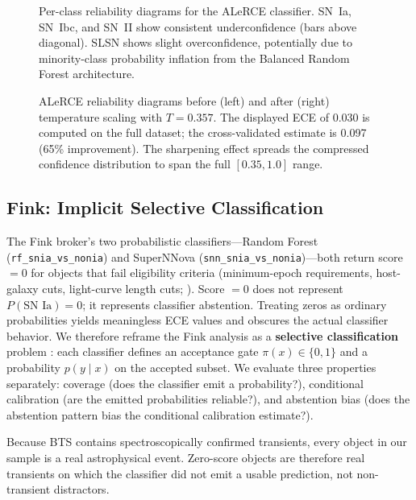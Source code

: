 \documentclass[twocolumn]{aastex631}
\begin{document}
\begin{figure}
\caption{Per-class reliability diagrams for the ALeRCE classifier. SN~Ia, SN~Ibc, and SN~II show consistent underconfidence (bars above diagonal). SLSN shows slight overconfidence, potentially due to minority-class probability inflation from the Balanced Random Forest architecture. \label{fig:alerce_perclass}}
\end{figure}

\begin{figure}
\caption{ALeRCE reliability diagrams before (left) and after (right) temperature scaling with $T = 0.357$. The displayed ECE of 0.030 is computed on the full dataset; the cross-validated estimate is 0.097 (65\% improvement). The sharpening effect spreads the compressed confidence distribution to span the full $[0.35, 1.0]$ range. \label{fig:alerce_tempscaling}}
\end{figure}


\subsection{Fink: Implicit Selective Classification} \label{sec:fink}

The Fink broker's two probabilistic classifiers---Random Forest (\texttt{rf\_snia\_vs\_nonia}) and SuperNNova (\texttt{snn\_snia\_vs\_nonia})---both return score $= 0$ for objects that fail eligibility criteria (minimum-epoch requirements, host-galaxy cuts, light-curve length cuts; \citealt{leoni2022, moller2020}). Score $= 0$ does not represent $P(\text{SN~Ia}) = 0$; it represents classifier abstention. Treating zeros as ordinary probabilities yields meaningless ECE values and obscures the actual classifier behavior. We therefore reframe the Fink analysis as a \textbf{selective classification} problem \citep{geifman2017}: each classifier defines an acceptance gate $\pi(x) \in \{0, 1\}$ and a probability $p(y \mid x)$ on the accepted subset. We evaluate three properties separately: coverage (does the classifier emit a probability?), conditional calibration (are the emitted probabilities reliable?), and abstention bias (does the abstention pattern bias the conditional calibration estimate?).

Because BTS contains spectroscopically confirmed transients, every object in our sample is a real astrophysical event. Zero-score objects are therefore real transients on which the classifier did not emit a usable prediction, not non-transient distractors.
\end{document}
